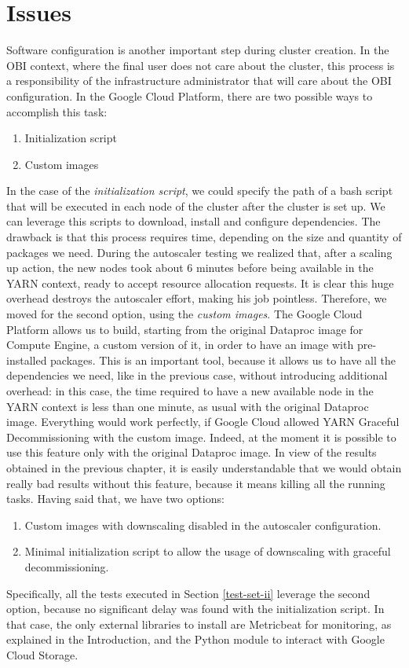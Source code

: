 \documentclass[12pt,twoside,cucitura]{toptesi}
\begin{document}
\section{Issues}
Software configuration is another important step during cluster creation. In the OBI context, where the final user does not care about the cluster, this process is a responsibility of the infrastructure administrator that will care about the OBI configuration. In the Google Cloud Platform, there are two possible ways to accomplish this task:
\begin{enumerate}
	\item Initialization script
	\item Custom images
\end{enumerate}
In the case of the \textit{initialization script}, we could specify the path of a bash script that will be executed in each node of the cluster after the cluster is set up. We can leverage this scripts to download, install and configure dependencies. The drawback is that this process requires time, depending on the size and quantity of packages we need. During the autoscaler testing we realized that, after a scaling up action, the new nodes took about 6 minutes before being available in the YARN context, ready to accept resource allocation requests. It is clear this huge overhead destroys the autoscaler effort, making his job pointless. Therefore, we moved for the second option, using the \textit{custom images}. The Google Cloud Platform allows us to build, starting from the original Dataproc image for Compute Engine, a custom version of it, in order to have an image with pre-installed packages. This is an important tool, because it allows us to have all the dependencies we need, like in the previous case, without introducing additional overhead: in this case, the time required to have a new available node in the YARN context is less than one minute, as usual with the original Dataproc image. Everything would work perfectly, if Google Cloud allowed YARN Graceful Decommissioning with the custom image. Indeed, at the moment it is possible to use this feature only with the original Dataproc image. In view of the results obtained in the previous chapter, it is easily understandable that we would obtain really bad results without this feature, because it means killing all the running tasks. Having said that, we have two options:
\begin{enumerate}
	\item Custom images with downscaling disabled in the autoscaler configuration.
	\item Minimal initialization script to allow the usage of downscaling with graceful decommissioning.
\end{enumerate}
Specifically, all the tests executed in Section \ref{test-set-ii} leverage the second option, because no significant delay was found with the initialization script. In that case, the only external libraries to install are Metricbeat for monitoring, as explained in the Introduction, and the Python module to interact with Google Cloud Storage.
\end{document}
